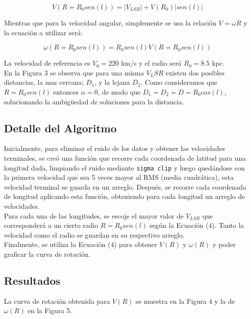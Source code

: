 \documentclass[letterpaper,oneside]{article}
\begin{document}
\begin{equation}
  V ( R=R_0 sen(l)) =   |V_{LSR}| + V(R_0) |sen(l)| 
\end{equation}

Mientras que para la velocidad angular, simplemente se usa la relación $V=\omega R$ y la ecuación a utilizar será:

\begin{equation}
  \omega ( R=R_0 sen(l)) =  R_0 sen(l)  V ( R=R_0 sen(l))
\end{equation}

La velocidad de referencia es $V_0 = 220$ km/s y el radio será $R_0 = 8.5$ kpc.\\

En la Figura 3 se observa que para una misma $V_LSR$ existen dos posibles distancias, la mas cercana;  $D_{1}$, y la lejana $D_{2}$. Como consideramos que $R=R_0 sen(l)$ entonces $\alpha=0$, de modo que $D_{1}=D_{2}=D=R_0cos(l)$, solucionando la ambigüedad de soluciones para la distancia. 

\subsection{Detalle del Algoritmo}
Inicialmente, para eliminar el ruido de los datos y obtener las velocidades terminales, se creó una función que recorre cada coordenada de latitud para una longitud dada, limpiando el ruido mediante \texttt{sigma clip} y luego quedándose con la primera velocidad que sea 5 veces mayor al RMS (media cuadrática), esta velocidad terminal se guarda en un arreglo. Después, se recorre cada coordenada de longitud aplicando esta función, obteniendo para cada longitud un arreglo de velocidades.\\

Para cada una de las longitudes, se escoje el mayor valor de $V_{LSR}$ que corresponderá a un cierto radio $R=R_0 sen(l)$ según la Ecuación (4). Tanto la velocidad como el radio se guardan en su respectivo arreglo.\\

Finalmente, se utiliza la Ecuación (4) para obtener $V(R)$ y $\omega (R)$ y poder graficar la curva de rotación.

\subsection{Resultados}
La curva de rotación obtenida para $V(R)$ se muestra en la Figura 4 y la de $\omega (R)$ en la Figura 5. 
\end{document}
